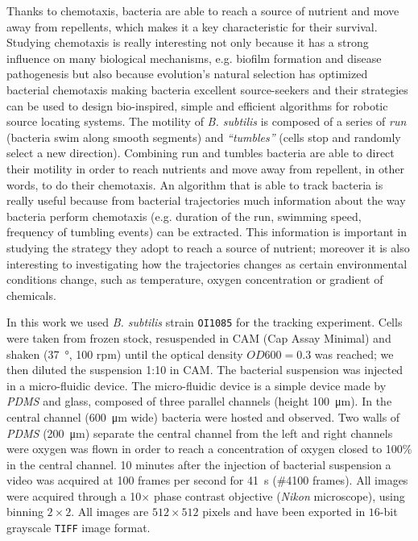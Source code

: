 \documentclass[conference]{IEEEtran}
\begin{document}
Thanks to chemotaxis, bacteria are able to reach a source of nutrient and move away from repellents, which makes it a key characteristic for their survival. Studying chemotaxis is really interesting not only because it has a strong influence on many biological mechanisms, e.g. biofilm formation and disease pathogenesis but also because  evolution's natural selection has optimized bacterial chemotaxis making bacteria excellent source-seekers and their strategies can be used to design bio-inspired, simple and efficient algorithms for robotic source locating systems. 
The motility  of \textit{B. subtilis} is composed of a series of \textit{run} (bacteria swim along smooth segments) and \textit{``tumbles''} (cells stop and randomly select a new direction).
Combining run and tumbles bacteria are able to direct their motility in order to reach nutrients and move away from repellent, in other words, to do their chemotaxis.
An algorithm that is able to track bacteria is really useful  because from bacterial trajectories much information about the way bacteria perform chemotaxis (e.g. duration of the run, swimming speed, frequency of tumbling events) can be extracted. 
This information is important in studying the strategy they adopt to reach a source of nutrient; moreover it is also interesting to investigating how the trajectories changes as certain environmental conditions change, such as temperature, oxygen concentration or gradient of chemicals.


In this work we used \textit{B. subtilis} strain \texttt{OI1085} for the tracking experiment.
Cells were taken from frozen stock, resuspended in CAM (Cap Assay Minimal) and shaken  (\SI{37}{\degree}, 100 rpm) until the optical density $OD600=0.3$ was reached; we then diluted the suspension 1:10 in CAM.
The bacterial suspension was injected in a micro-fluidic device.
The micro-fluidic device is a simple device made by \textit{PDMS} and glass, composed of three parallel channels (height  \SI{100}{\micro\meter}).
In the central channel (\SI{600}{\micro\meter} wide) bacteria were hosted and observed.
Two  walls of \textit{PDMS} (\SI{200}{\micro\metre}) separate the central channel from the left and right channels were oxygen was flown in order to reach a concentration of oxygen closed to 100\% in the central channel.
10 minutes after the injection of bacterial suspension a video was acquired at 100 frames per second for \SI{41}{\second}  (\#4100 frames). All images were acquired through a 10$\times$ phase contrast objective (\textit{Nikon} microscope), using binning $2 \times 2$.
All images are $512 \times 512$ pixels and have been exported in $16$-bit grayscale \texttt{TIFF} image format.
\end{document}
